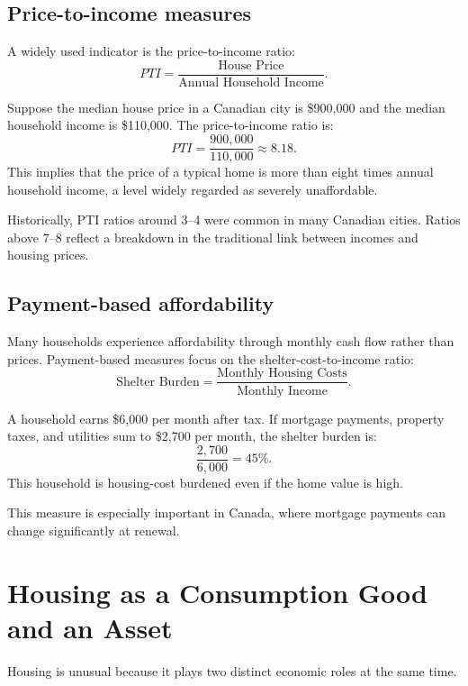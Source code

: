 \documentclass[11pt]{article}
\begin{document}
\subsection*{Price-to-income measures}

A widely used indicator is the price-to-income ratio:
\[
PTI = \frac{\text{House Price}}{\text{Annual Household Income}}.
\]

\begin{examplebox}
Suppose the median house price in a Canadian city is \$900{,}000 and the median household income is \$110{,}000. The price-to-income ratio is:
\[
PTI = \frac{900{,}000}{110{,}000} \approx 8.18.
\]
This implies that the price of a typical home is more than eight times annual household income, a level widely regarded as severely unaffordable.
\end{examplebox}

Historically, PTI ratios around 3–4 were common in many Canadian cities. Ratios above 7–8 reflect a breakdown in the traditional link between incomes and housing prices.

\subsection*{Payment-based affordability}

Many households experience affordability through monthly cash flow rather than prices. Payment-based measures focus on the shelter-cost-to-income ratio:
\[
\text{Shelter Burden} = \frac{\text{Monthly Housing Costs}}{\text{Monthly Income}}.
\]

\begin{examplebox}
A household earns \$6{,}000 per month after tax. If mortgage payments, property taxes, and utilities sum to \$2{,}700 per month, the shelter burden is:
\[
\frac{2{,}700}{6{,}000} = 45\%.
\]
This household is housing-cost burdened even if the home value is high.
\end{examplebox}

This measure is especially important in Canada, where mortgage payments can change significantly at renewal.

\section{Housing as a Consumption Good and an Asset}

Housing is unusual because it plays two distinct economic roles at the same time.
\end{document}
